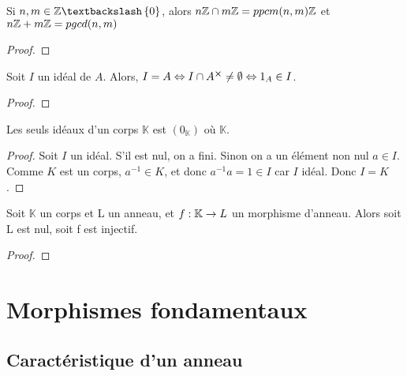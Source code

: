 \begin{proposition}
	Si $n, m \in \integer \textbackslash \GSset{0}$, alors $n\mathbb{Z} \cap
	m\mathbb{Z} = ppcm(n, m)\mathbb{Z}$ et $n\mathbb{Z} + m\mathbb{Z} = pgcd(n, m)$
\end{proposition}

\ifdefined\outputproof
\begin{proof}

\end{proof}
\fi

\begin{proposition}
	Soit $I$ un idéal de $A$. Alors, $I = A \Leftrightarrow I \cap A^{\cross} \neq
	\emptyset \Leftrightarrow 1_{A} \in I$.
\end{proposition}

\ifdefined\outputproof
\begin{proof}

\end{proof}
\fi

\begin{proposition}
	Les seuls idéaux d'un corps $\mathbb{K}$ est $(0_{\mathbb{K}})$ où
	$\mathbb{K}$.
\end{proposition}

\ifdefined\outputproof
\begin{proof}
	Soit $I$ un idéal. S'il est nul, on a fini. Sinon on a un élément non
	nul $a \in I$. Comme $K$ est un corps, $a^{-1} \in K$, et donc $a^{-1}a = 1
	\in I$ car $I$ idéal. Donc $I = K$.
\end{proof}
\fi

\begin{corollary}
	Soit $\mathbb{K}$ un corps et L un anneau, et
	$f : \mathbb{K} \rightarrow L$ un morphisme d'anneau. Alors soit L est nul,
	soit f est injectif.
\end{corollary}

\ifdefined\outputproof
\begin{proof}

\end{proof}
\fi


\section{Morphismes fondamentaux}

\subsection{Caractéristique d'un anneau}
\label{subsection:ring_caracteristic}


